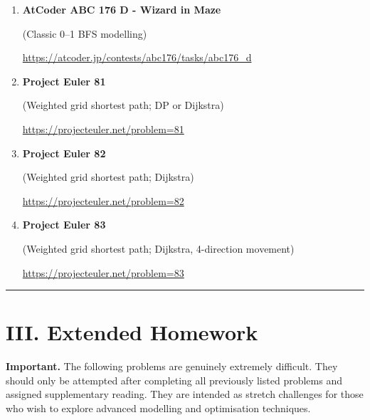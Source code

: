 \documentclass[11pt]{article}
\begin{document}
\begin{enumerate}
    \item \textbf{AtCoder ABC 176 D - Wizard in Maze}

    (Classic 0--1 BFS modelling)

    \vspace{0.3em}
    {\url{https://atcoder.jp/contests/abc176/tasks/abc176_d}}

    \vspace{0.8em}

    \item \textbf{Project Euler 81}

    (Weighted grid shortest path; DP or Dijkstra)

    \vspace{0.3em}
    {\url{https://projecteuler.net/problem=81}}

    \vspace{0.8em}

    \item \textbf{Project Euler 82}

    (Weighted grid shortest path; Dijkstra)

    \vspace{0.3em}
    {\url{https://projecteuler.net/problem=82}}

    \vspace{0.8em}

    \item \textbf{Project Euler 83}

    (Weighted grid shortest path; Dijkstra, 4-direction movement)

    \vspace{0.3em}
    {\url{https://projecteuler.net/problem=83}}

\end{enumerate}

\vspace{1em}
\hrule
\vspace{1em}

\section*{III. Extended Homework}

\textbf{Important.} The following problems are genuinely extremely difficult.  
They should only be attempted after completing all previously listed problems and assigned supplementary reading.  
They are intended as stretch challenges for those who wish to explore advanced modelling and optimisation techniques.
\end{document}

